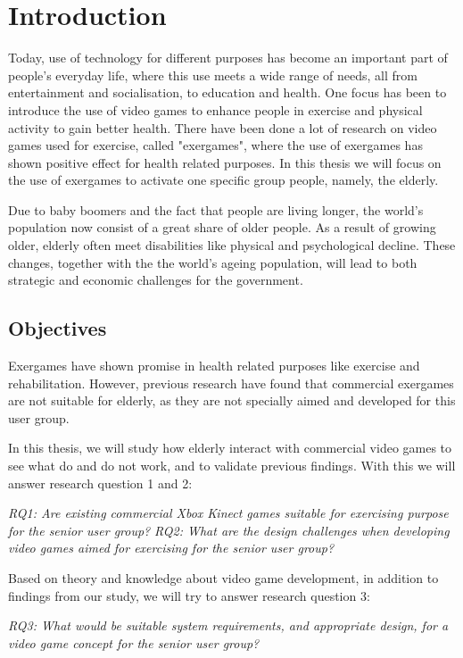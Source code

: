 \chapter{Introduction}

Today, use of technology for different purposes has become an important part of people's everyday life, where this use meets a wide range of needs, all from entertainment and socialisation, to education and health. One focus has been to introduce the use of video games to enhance people in exercise and physical activity to gain better health. There have been done a lot of research on video games used for exercise, called "exergames", where the use of exergames has shown positive effect for health related purposes. In this thesis we will focus on the use of exergames to activate one specific group people, namely, the elderly. 

Due to baby boomers and the fact that people are living longer, the world's population now consist of a great share of older people. As a result of growing older, elderly often meet disabilities like physical and psychological decline. These changes, together with the the world's ageing population, will lead to both strategic and economic challenges for the government.          


\section{Objectives}
\label{sec:researchq}
Exergames have shown promise in health related purposes like exercise and rehabilitation. However, previous research have found that commercial exergames are not suitable for elderly, as they are not specially aimed and developed for this user group. 

In this thesis, we will study how elderly interact with commercial video games to see what do and do not work, and to validate previous findings. With this we will answer research question 1 and 2: 

\emph{RQ1: Are existing commercial Xbox Kinect games suitable for exercising purpose for the senior user group?} 
\emph{RQ2: What are the design challenges when developing video games aimed for exercising for the senior user group?}

Based on theory and knowledge about video game development, in addition to findings from our study, we will try to answer research question 3:

\emph{RQ3: What would be suitable system requirements, and appropriate design, for a video game concept for the senior user group?}

